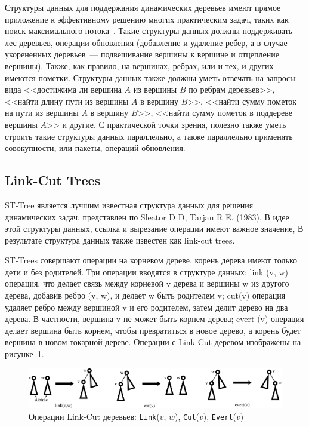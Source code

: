 \documentclass[specification,annotation]{itmo-student-thesis}
\newcommand{\revise}[1]{{\color{red!70!black} #1 }}
\begin{document}
Структуры данных для поддержания динамических деревьев имеют прямое приложение к эффективному решению многих практическим задач,
таких как поиск максимального потока~\cite{goldberg88}. Такие структуры данных должны поддерживать лес деревьев,
операции обновления (добавление и удаление ребер, а в случае укорененных деревьев~--- подвешивание вершины к вершине и отцепление вершины).
Также, как правило, на вершинах, ребрах, или и тех, и других имеются пометки. Структуры данных также должны уметь отвечать на запросы
вида <<достижима ли вершина $A$ из вершины $B$ по ребрам деревьев>>, <<найти длину пути из вершины $A$ в вершину $B$>>,
<<найти сумму пометок на пути из вершины $A$ в вершину $B$>>, <<найти сумму пометок в поддереве вершины $A$>> и другие.
С практической точки зрения, полезно также уметь строить такие структуры данных параллельно, а также параллельно применять совокупности, или пакеты, операций обновления.

\subsection{Link-Cut Trees}

\revise{
ST-Tree является лучшим известная структура данных для решения динамических задач, представлен по Sleator D D, Tarjan R E. (1983). В идее этой структуры данных, ссылка и вырезание операции имеют важное 
значение, В результате структура данных также известен как link-cut trees.
}

\revise{
ST-Trees совершают операции на корневом дереве, корень дерева имеют только дети и без родителей. Три операции вводятся в структуре данных: link (v, w) операция, что делает связь между корневой v дерева и 
вершины w из другого дерева, добавив ребро (v, w), и делает w быть родителем v; cut(v) операция удаляет ребро между вершиной v и его родителем, затем делит дерево на два дерева. В частности, вершина v не 
может быть корнем дерева; evert (v) операция делает вершина быть корнем, чтобы превратиться в новое дерево, а корень будет вершина в новом токарной дереве. Операции с Link-Cut деревом изображены на 
рисунке~\ref{fig:link-cut-tree}.
}

\begin{figure}[!ht]
\centering
\includegraphics[width=\textwidth]{pic/link-cut-tree.png}
\caption{Операции Link-Cut деревьев: \texttt{Link}($v$, $w$), \texttt{Cut}($v$), \texttt{Evert}($v$)}\label{fig:link-cut-tree}
\end{figure}
\end{document}
